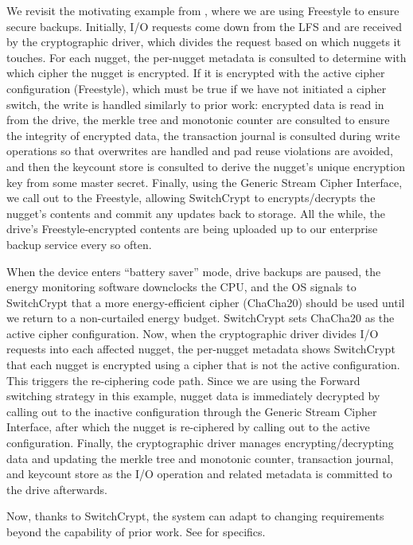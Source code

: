 We revisit the motivating example from , where we are
using Freestyle to ensure secure backups. Initially, I/O requests come down from
the LFS and are received by the cryptographic driver, which divides the request
based on which nuggets it touches. For each nugget, the per-nugget metadata is
consulted to determine with which cipher the nugget is encrypted. If it is
encrypted with the active cipher configuration (Freestyle), which must be true
if we have not initiated a cipher switch, the write is handled similarly to
prior work: encrypted data is read in from the drive, the merkle tree and
monotonic counter are consulted to ensure the integrity of encrypted data, the
transaction journal is consulted during write operations so that overwrites are
handled and pad reuse violations are avoided, and then the keycount store is
consulted to derive the nugget's unique encryption key from some master secret.
Finally, using the Generic Stream Cipher Interface, we call out to the
Freestyle, allowing SwitchCrypt to encrypts/decrypts the nugget's contents and
commit any updates back to storage. All the while, the drive's
Freestyle-encrypted contents are being uploaded up to our enterprise backup
service every so often.

When the device enters ``battery saver'' mode, drive backups are paused, the
energy monitoring software downclocks the CPU, and the OS signals to SwitchCrypt
that a more energy-efficient cipher (ChaCha20) should be used until we return to
a non-curtailed energy budget. SwitchCrypt sets ChaCha20 as the active cipher
configuration. Now, when the cryptographic driver divides I/O requests into each
affected nugget, the per-nugget metadata shows SwitchCrypt that each nugget is
encrypted using a cipher that is not the active configuration. This triggers the
re-ciphering code path. Since we are using the Forward switching strategy in
this example, nugget data is immediately decrypted by calling out to the
inactive configuration through the Generic Stream Cipher Interface, after which
the nugget is re-ciphered by calling out to the active configuration. Finally,
the cryptographic driver manages encrypting/decrypting data and updating the
merkle tree and monotonic counter, transaction journal, and keycount store as
the I/O operation and related metadata is committed to the drive afterwards.

Now, thanks to SwitchCrypt, the system can adapt to changing requirements beyond
the capability of prior work. See  for specifics.
